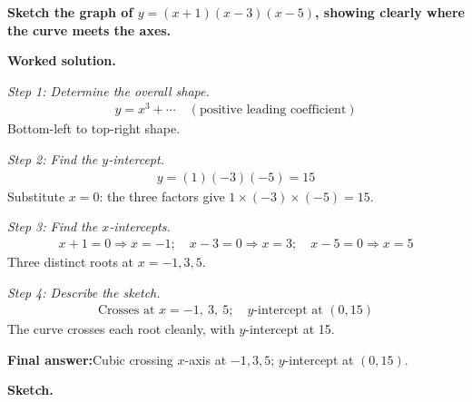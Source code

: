 \documentclass[11pt]{article}
\newcommand{\question}[1]{\par\medskip\noindent\textbf{#1}\par}
\begin{document}
\question{Sketch the graph of \( y = (x + 1)(x - 3)(x - 5) \), showing clearly where the curve meets the axes.}

\textbf{Worked solution.}

\textit{Step 1: Determine the overall shape.}
\[\begin{gathered}
y = x^3 + \cdots \quad (\text{positive leading coefficient})
\end{gathered}\]
Bottom-left to top-right shape.

\textit{Step 2: Find the \( y \)-intercept.}
\[\begin{gathered}
y = (1)(-3)(-5) = 15
\end{gathered}\]
Substitute \( x = 0 \): the three factors give \( 1 \times (-3) \times (-5) = 15 \).

\textit{Step 3: Find the \( x \)-intercepts.}
\[\begin{gathered}
x + 1 = 0 \Rightarrow x = -1; \quad x - 3 = 0 \Rightarrow x = 3; \quad x - 5 = 0 \Rightarrow x = 5
\end{gathered}\]
Three distinct roots at \( x = -1, 3, 5 \).

\textit{Step 4: Describe the sketch.}
\[\begin{gathered}
\text{Crosses at } x = -1,\ 3,\ 5; \quad y\text{-intercept at } (0, 15)
\end{gathered}\]
The curve crosses each root cleanly, with \( y \)-intercept at 15.

\begin{answerbox}
\textbf{Final answer:}\quad Cubic crossing \(\displaystyle x\)-axis at \(\displaystyle -1, 3, 5\); \(\displaystyle y\)-intercept at \(\displaystyle (0, 15)\).
\end{answerbox}
\textbf{Sketch.}
\end{document}
